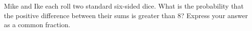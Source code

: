 Mike and Ike each roll two standard six-sided dice. What is the probability that the positive difference between their sums is greater than $8$? Express your answer as a common fraction.
